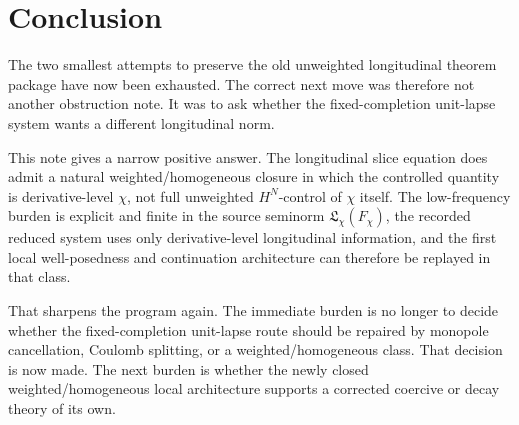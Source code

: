 \documentclass[11pt]{article}
\begin{document}
\section{Conclusion}

The two smallest attempts to preserve the old unweighted longitudinal theorem package have now been exhausted. The correct next move was therefore not another obstruction note. It was to ask whether the fixed-completion unit-lapse system wants a different longitudinal norm.

This note gives a narrow positive answer. The longitudinal slice equation does admit a natural weighted/homogeneous closure in which the controlled quantity is derivative-level \(\chi\), not full unweighted \(H^N\)-control of \(\chi\) itself. The low-frequency burden is explicit and finite in the source seminorm \(\mathfrak L_\chi(F_\chi)\), the recorded reduced system uses only derivative-level longitudinal information, and the first local well-posedness and continuation architecture can therefore be replayed in that class.

That sharpens the program again. The immediate burden is no longer to decide whether the fixed-completion unit-lapse route should be repaired by monopole cancellation, Coulomb splitting, or a weighted/homogeneous class. That decision is now made. The next burden is whether the newly closed weighted/homogeneous local architecture supports a corrected coercive or decay theory of its own.
\end{document}
